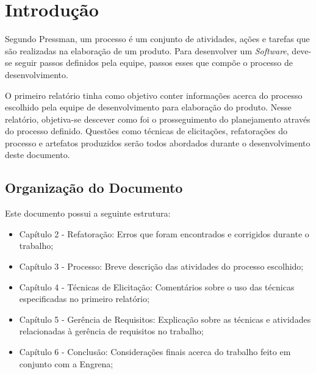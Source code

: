 \chapter{Introdução}
\label{introduction}

Segundo Pressman, um processo é um conjunto de atividades, ações e tarefas que são realizadas na elaboração de um produto. Para desenvolver um \textit{Software}, deve-se seguir passos definidos pela equipe, passos esses que compõe o processo de desenvolvimento.~\cite{pressman}

O primeiro relatório tinha como objetivo conter informações acerca do processo escolhido pela equipe de desenvolvimento para elaboração do produto. Nesse relatório, objetiva-se descever como foi o prosseguimento do planejamento através do processo definido. Questões como técnicas de elicitações, refatorações do processo e artefatos produzidos serão todos abordados durante o desenvolvimento deste documento.

\section{Organização do Documento}

Este documento possui a seguinte estrutura:
\begin{itemize}
\item Capítulo 2 - Refatoração: Erros que foram encontrados e corrigidos durante o trabalho;
\item Capítulo 3 - Processo: Breve descrição das atividades do processo escolhido;
\item Capítulo 4 - Técnicas de Elicitação: Comentários sobre o uso das técnicas especificadas no primeiro relatório;
\item Capítulo 5 - Gerência de Requisitos: Explicação sobre as técnicas e atividades relacionadas à gerência de requisitos no trabalho;
\item Capítulo 6 - Conclusão: Considerações finais acerca do trabalho feito em conjunto com a Engrena;
\end{itemize}
